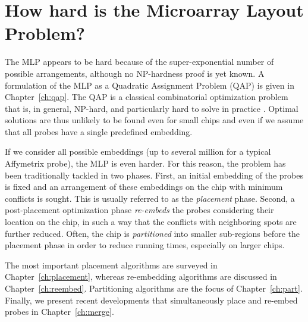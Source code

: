 \section{How hard is the Microarray Layout Problem?}
\label{sec:mlp_how_hard}

The MLP appears to be hard because of the super-exponential number of possible
arrangements, although no NP-hardness proof is yet known. A formulation of the
MLP as a Quadratic Assignment Problem (QAP) is given in Chapter~\ref{ch:qap}.
The QAP is a classical combinatorial optimization problem that is, in general,
NP-hard, and particularly hard to solve in practice \citep{Cela1997}. Optimal
solutions are thus unlikely to be found even for small chips and even if we
assume that all probes have a single predefined embedding.

If we consider all possible embeddings (up to several million for a typical
Affymetrix probe), the MLP is even harder. For this reason, the problem has been
traditionally tackled in two phases. First, an initial embedding of the probes
is fixed and an arrangement of these embeddings on the chip with minimum
conflicts is sought. This is usually referred to as the \emph{placement} phase.
Second, a post-placement optimization phase \emph{re-embeds} the probes
considering their location on the chip, in such a way that the conflicts with
neighboring spots are further reduced. Often, the chip is \emph{partitioned}
into smaller sub-regions before the placement phase in order to reduce running
times, especially on larger chips.

The most important placement algorithms are surveyed in
Chapter~\ref{ch:placement}, whereas re-embedding algorithms are discussed in
Chapter~\ref{ch:reembed}. Partitioning algorithms are the focus of
Chapter~\ref{ch:part}. Finally, we present recent developments that
simultaneously place and re-embed probes in Chapter~\ref{ch:merge}.
